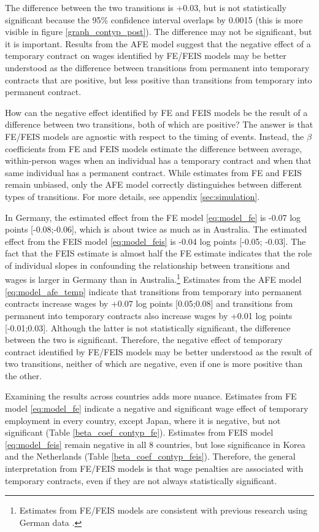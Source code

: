 \documentclass[12pt]{article}
\begin{document}
The difference between the two transitions is +0.03, but is not statistically significant because the 95\% confidence interval overlaps by 0.0015 (this is more visible in figure \ref{graph_contyp_post}).  The difference may not be significant, but it is important.  Results from the AFE model suggest that the negative effect of a temporary contract on wages identified by FE/FEIS models may be better understood as the difference between transitions from permanent into temporary contracts that are positive, but less positive than transitions from temporary into permanent contract.  

How can the negative effect identified by FE and FEIS models be the result of a difference between two transitions, both of which are positive?  The answer is that FE/FEIS models are agnostic with respect to the timing of events.  Instead, the $\beta$ coefficients from FE and FEIS models estimate the difference between average, within-person wages when an individual has a temporary contract and when that same individual has a permanent contract.  While estimates from FE and FEIS remain unbiased, only the AFE model correctly distinguishes between different types of transitions.  For more details, see appendix \ref{sec:simulation}.

In Germany, the estimated effect from the FE model \ref{eq:model_fe} is -0.07 log points [-0.08;-0.06], which is about twice as much as in Australia. The estimated effect from the FEIS model \ref{eq:model_feis} is -0.04 log points [-0.05; -0.03].  The fact that the FEIS estimate is almost half the FE estimate indicates that the role of individual slopes in confounding the relationship between transitions and wages is larger in Germany than in Australia.\footnote{ Estimates from FE/FEIS models are consistent with previous research using German data \citep{giesecke_external_2004,mertens_wages_2004}.}  Estimates from the AFE model \ref{eq:model_afe_temp} indicate that transitions from temporary into permanent contracts increase wages by +0.07 log points [0.05;0.08] and transitions from permanent into temporary contracts also increase wages by +0.01 log points [-0.01;0.03].  Although the latter is not statistically significant, the difference between the two is significant.  Therefore, the negative effect of temporary contract identified by FE/FEIS models may be better understood as the result of two transitions, neither of which are negative, even if one is more positive than the other.

Examining the results across countries adds more nuance.  Estimates from FE model \ref{eq:model_fe} indicate a negative and significant wage effect of temporary employment in every country, except Japan, where it is negative, but not significant (Table \ref{beta_coef_contyp_fe}).  Estimates from FEIS model \ref{eq:model_feis} remain negative in all 8 countries, but lose significance in Korea and the Netherlands (Table \ref{beta_coef_contyp_feis}).  Therefore, the general interpretation from FE/FEIS models is that wage penalties are associated with temporary contracts, even if they are not always statistically significant.  
\end{document}
